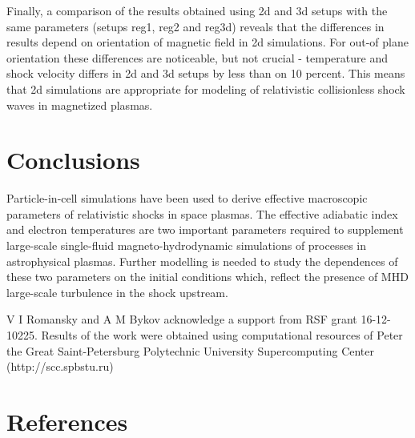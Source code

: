\documentclass[a4paper]{jpconf}
\begin{document}
	Finally, a comparison of the results obtained using 2d and 3d setups with the same parameters (setups reg1, reg2 and reg3d) reveals that the differences in results depend on orientation of magnetic field in 2d simulations. For out-of plane orientation these differences are noticeable, but not crucial - temperature and shock velocity differs in 2d and 3d setups by less than on 10 percent. This means that 2d simulations are appropriate for modeling of relativistic collisionless shock waves in magnetized plasmas. 
	
	\section{Conclusions}
	
	Particle-in-cell simulations have been used to derive effective macroscopic parameters of relativistic shocks in space plasmas. The effective adiabatic index and electron temperatures are two important parameters required to supplement large-scale single-fluid magneto-hydrodynamic simulations of processes in astrophysical plasmas. Further modelling is needed to study the dependences of these two parameters  on the initial conditions which, reflect the presence of MHD large-scale turbulence in the shock upstream. 
	
	\ack
	V I Romansky and A M Bykov acknowledge a support from RSF grant 16-12-10225.
	Results of the work were obtained using computational resources of Peter the Great Saint-Petersburg Polytechnic University Supercomputing Center (http://scc.spbstu.ru)
	
	\section*{References}
	

	
\end{document}
